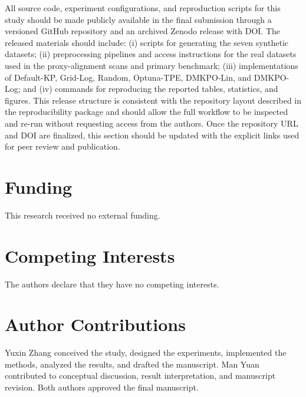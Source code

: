 \documentclass[10pt,lineno]{wlpeerj}
\begin{document}
All source code, experiment configurations, and reproduction scripts for this study should be made publicly available in the final submission through a versioned GitHub repository and an archived Zenodo release with DOI. The released materials should include: (i) scripts for generating the seven synthetic datasets; (ii) preprocessing pipelines and access instructions for the real datasets used in the proxy-alignment scans and primary benchmark; (iii) implementations of Default-KP, Grid-Log, Random, Optuna-TPE, DMKPO-Lin, and DMKPO-Log; and (iv) commands for reproducing the reported tables, statistics, and figures. This release structure is consistent with the repository layout described in the reproducibility package and should allow the full workflow to be inspected and re-run without requesting access from the authors. Once the repository URL and DOI are finalized, this section should be updated with the explicit links used for peer review and publication.

\section*{Funding}

This research received no external funding.

\section*{Competing Interests}

The authors declare that they have no competing interests.

\section*{Author Contributions}

Yuxin Zhang conceived the study, designed the experiments, implemented the methods, analyzed the results, and drafted the manuscript. Man Yuan contributed to conceptual discussion, result interpretation, and manuscript revision. Both authors approved the final manuscript.



\end{document}

